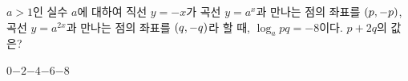 $a>1$인 실수 $a$에 대하여 직선 $y=-x$가 곡선 $y=a^x$과 만나는 점의 좌표를 $(p{,}\mkern3mu\mathopen{}-p)$, 곡선 $y=a^{2x}$과 만나는 점의 좌표를 $(q{,}\mkern3mu\mathopen{}-q)$라 할 때, $\log_a pq=-8$이다. $p+2q$의 값은?
\begin{choices32}{$0$}{$-2$}{$-4$}{$-6$}{$-8$}\end{choices32}
